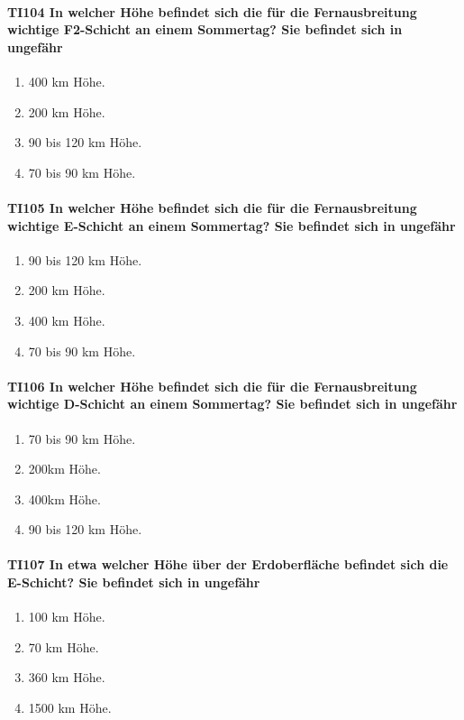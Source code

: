 \documentclass[8pt]{article}
\begin{document}
\paragraph*{TI104 In welcher Höhe befindet sich die für die Fernausbreitung wichtige F2-Schicht an einem Sommertag? Sie befindet sich in ungefähr}
\begin{enumerate}[nolistsep,label=\Alph*]
\item 400 km Höhe.
\item 200 km Höhe.
\item 90 bis 120 km Höhe.
\item 70 bis 90 km Höhe.
\end{enumerate}

\paragraph*{TI105 In welcher Höhe befindet sich die für die Fernausbreitung wichtige E-Schicht an einem Sommertag? Sie befindet sich in ungefähr}
\begin{enumerate}[nolistsep,label=\Alph*]
\item 90 bis 120 km Höhe.
\item 200 km Höhe.
\item 400 km Höhe.
\item 70 bis 90 km Höhe.
\end{enumerate}

\paragraph*{TI106 In welcher Höhe befindet sich die für die Fernausbreitung wichtige D-Schicht an einem Sommertag? Sie befindet sich in ungefähr}
\begin{enumerate}[nolistsep,label=\Alph*]
\item 70 bis 90 km Höhe.
\item 200km Höhe.
\item 400km Höhe.
\item 90 bis 120 km Höhe.
\end{enumerate}

\paragraph*{TI107 In etwa welcher Höhe über der Erdoberfläche befindet sich die E-Schicht? Sie befindet sich in ungefähr}
\begin{enumerate}[nolistsep,label=\Alph*]
\item 100 km Höhe.
\item 70 km Höhe.
\item 360 km Höhe.
\item 1500 km Höhe.
\end{enumerate}
\end{document}
